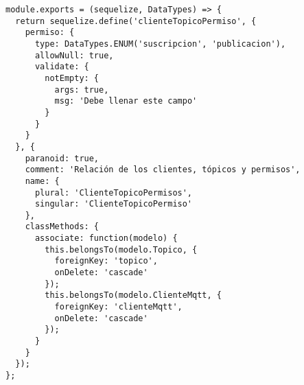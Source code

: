 \begin{lstlisting}[label=anx:modelo_cliente_topico_permiso]
module.exports = (sequelize, DataTypes) => {
  return sequelize.define('clienteTopicoPermiso', {
    permiso: {
      type: DataTypes.ENUM('suscripcion', 'publicacion'),
      allowNull: true,
      validate: {
        notEmpty: {
          args: true,
          msg: 'Debe llenar este campo'
        }
      }
    }
  }, {
    paranoid: true,
    comment: 'Relación de los clientes, tópicos y permisos',
    name: {
      plural: 'ClienteTopicoPermisos',
      singular: 'ClienteTopicoPermiso'
    },
    classMethods: {
      associate: function(modelo) {
        this.belongsTo(modelo.Topico, {
          foreignKey: 'topico',
          onDelete: 'cascade'
        });
        this.belongsTo(modelo.ClienteMqtt, {
          foreignKey: 'clienteMqtt',
          onDelete: 'cascade'
        });
      }
    }
  });
};
\end{lstlisting}